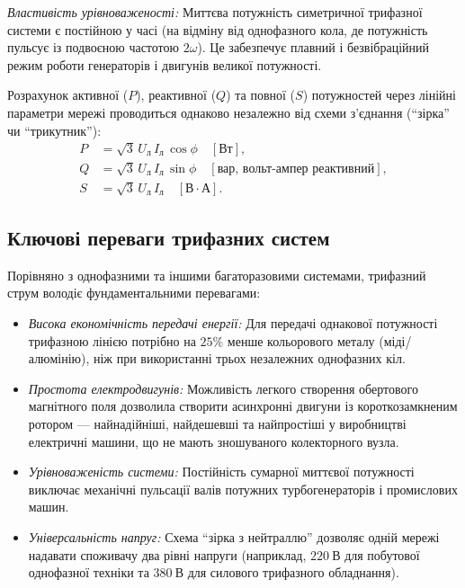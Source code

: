 \emph{Властивість урівноваженості:} Миттєва потужність симетричної трифазної системи є постійною у часі (на відміну від однофазного кола, де потужність пульсує із подвоєною частотою $2\omega$). Це забезпечує плавний і безвібраційний режим роботи генераторів і двигунів великої потужності.

Розрахунок активної ($P$), реактивної ($Q$) та повної ($S$) потужностей через лінійні параметри мережі проводиться однаково незалежно від схеми з'єднання (\enquote{зірка} чи \enquote{трикутник}):
\begin{align}
	P &= \sqrt{3} \, U_\text{л} \, I_\text{л} \, \cos\phi \quad [\text{Вт}], \\
	Q &= \sqrt{3} \, U_\text{л} \, I_\text{л} \, \sin\phi \quad [\text{вар, вольт-ампер реактивний} ], \\
	S &= \sqrt{3} \, U_\text{л} \, I_\text{л} \quad [\text{В}\cdot\text{А}].
\end{align}

\subsection*{Ключові переваги трифазних систем}

Порівняно з однофазними та іншими багаторазовими системами, трифазний струм володіє фундаментальними перевагами:
\begin{itemize}
    \item \emph{Висока економічність передачі енергії:} Для передачі однакової потужності трифазною лінією потрібно на $25\%$ менше кольорового металу (міді/алюмінію), ніж при використанні трьох незалежних однофазних кіл.
    \item \emph{Простота електродвигунів:} Можливість легкого створення обертового магнітного поля дозволила створити асинхронні двигуни із короткозамкненим ротором --- найнадійніші, найдешевші та найпростіші у виробництві електричні машини, що не мають зношуваного колекторного вузла.
    \item \emph{Урівноваженість системи:} Постійність сумарної миттєвої потужності виключає механічні пульсації валів потужних турбогенераторів і промислових машин.
    \item \emph{Універсальність напруг:} Схема \enquote{зірка з нейтраллю} дозволяє одній мережі надавати споживачу два рівні напруги (наприклад, $220~\text{В}$ для побутової однофазної техніки та $380~\text{В}$ для силового трифазного обладнання).
\end{itemize}


